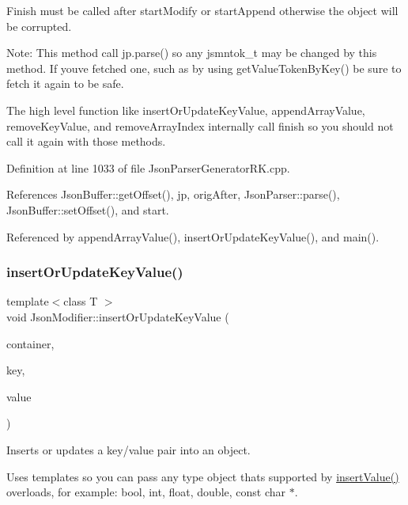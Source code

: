 Finish must be called after start\+Modify or start\+Append otherwise the object will be corrupted.

Note\+: This method call jp.\+parse() so any jsmntok\+\_\+t may be changed by this method. If you\textquotesingle{}ve fetched one, such as by using get\+Value\+Token\+By\+Key() be sure to fetch it again to be safe.

The high level function like insert\+Or\+Update\+Key\+Value, append\+Array\+Value, remove\+Key\+Value, and remove\+Array\+Index internally call finish so you should not call it again with those methods. 

Definition at line 1033 of file Json\+Parser\+Generator\+R\+K.\+cpp.



References Json\+Buffer\+::get\+Offset(), jp, orig\+After, Json\+Parser\+::parse(), Json\+Buffer\+::set\+Offset(), and start.



Referenced by append\+Array\+Value(), insert\+Or\+Update\+Key\+Value(), and main().

\mbox{\label{class_json_modifier_acca6028c0ec31489950f43e86c574229}} 
\subsubsection{\texorpdfstring{insert\+Or\+Update\+Key\+Value()}{insertOrUpdateKeyValue()}}
{\footnotesize\ttfamily template$<$class T $>$ \\
void Json\+Modifier\+::insert\+Or\+Update\+Key\+Value (\begin{DoxyParamCaption}\item[{const \hyperlink{struct_json_parser_generator_r_k_1_1jsmntok__t}{Json\+Parser\+Generator\+R\+K\+::jsmntok\+\_\+t} $\ast$}]{container,  }\item[{const char $\ast$}]{key,  }\item[{T}]{value }\end{DoxyParamCaption})\hspace{0.3cm}{\ttfamily [inline]}}



Inserts or updates a key/value pair into an object. 

Uses templates so you can pass any type object that\textquotesingle{}s supported by \hyperlink{class_json_writer_ac58734c238ba7be066838591b0cc7743}{insert\+Value()} overloads, for example\+: bool, int, float, double, const char $\ast$.

